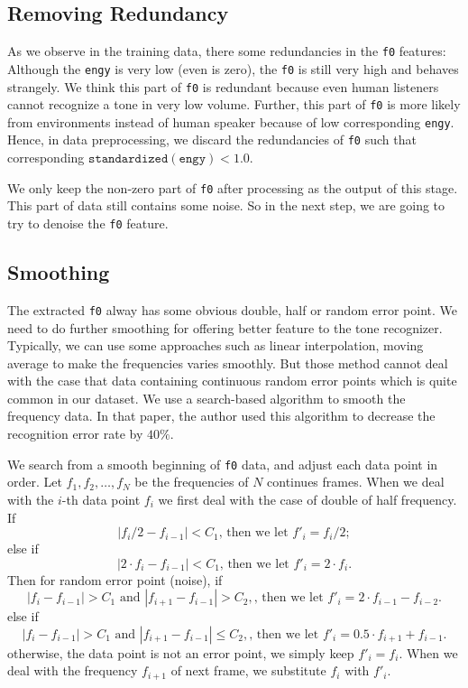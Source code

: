 \documentclass[a4paper]{article}
\begin{document}
\subsection{Removing Redundancy}
As we observe in the training data, there some redundancies in the \texttt{f0} features: Although the \texttt{engy} is very low (even is zero), the \texttt{f0} is still very high and behaves strangely. We think this part of \texttt{f0} is redundant because even human listeners cannot recognize a tone in very low volume. Further, this part of \texttt{f0} is more likely from environments instead of human speaker because of low corresponding \texttt{engy}. Hence, in data preprocessing, we discard the redundancies of \texttt{f0} such that corresponding $\mathtt{standardized(engy)} < 1.0$. 

We only keep the non-zero part of \texttt{f0} after processing as the output of this stage. This part of data still contains some noise. So in the next step, we are going to try to denoise the \texttt{f0} feature.

\subsection{Smoothing}
The extracted \texttt{f0} alway has some obvious double, half or random error point. We need to do further smoothing for offering better feature to the tone recognizer. Typically, we can use some approaches such as linear interpolation, moving average to make the frequencies varies smoothly. But those method cannot deal with the case that data containing continuous random error points which is quite common in our dataset. We use a search-based algorithm
	to smooth the frequency data. In that paper, the author used this algorithm to decrease the recognition error rate by $40\%$. 
	
We search from a smooth beginning of \texttt{f0} data, and adjust each data point in order. Let $f_1, f_2, \dots, f_{N}$ be the frequencies of $N$ continues frames. When we deal with the $i$-th data point $f_i$ we first deal with the case of double of half frequency. If 
\[ |f_i / 2 - f_{i-1}| < C_1 \text{, then we let } f'_i = f_i / 2;\]
else if 
\[ |2 \cdot f_i- f_{i-1}| < C_1 \text{, then we let } f'_i = 2 \cdot f_i.\]
Then for random error point (noise), if
\[|f_i - f_{i - 1}| > C_1 \text{ and } |f_{i + 1} - f_{i - 1}| > C_2,\text{, then we let } f'_i = 2 \cdot f_{i- 1} - f_{i - 2}. \]
else if
\[|f_i - f_{i - 1}| > C_1 \text{ and } |f_{i + 1} - f_{i - 1}| \leq C_2,\text{, then we let } f'_i = 0.5 \cdot f_{i + 1} + f_{i - 1}. \]
otherwise, the data point is not an error point, we simply keep $f'_i = f_i$. When we deal with the frequency $f_{i+1}$ of next frame, we substitute $f_{i}$ with $f'_i$.
\end{document}
